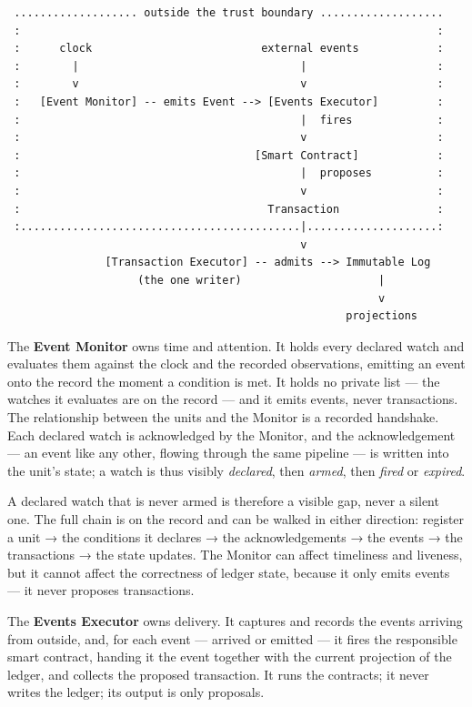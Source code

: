 \documentclass[11pt,a4paper]{article}
\begin{document}
\begin{verbatim}
 ................... outside the trust boundary ...................
 :                                                                :
 :      clock                          external events            :
 :        |                                  |                    :
 :        v                                  v                    :
 :   [Event Monitor] -- emits Event --> [Events Executor]         :
 :                                           |  fires             :
 :                                           v                    :
 :                                    [Smart Contract]            :
 :                                           |  proposes          :
 :                                           v                    :
 :                                      Transaction               :
 :...........................................|....................:
                                             v
               [Transaction Executor] -- admits --> Immutable Log
                    (the one writer)                     |
                                                         v
                                                    projections
\end{verbatim}

The \textbf{Event Monitor} owns time and attention. It holds every
declared watch and evaluates them against the clock and the recorded
observations, emitting an event onto the record the moment a condition
is met. It holds no private list --- the watches it evaluates are on the
record --- and it emits events, never transactions. The relationship
between the units and the Monitor is a recorded handshake. Each declared
watch is acknowledged by the Monitor, and the acknowledgement --- an
event like any other, flowing through the same pipeline --- is written
into the unit's state; a watch is thus visibly \emph{declared}, then
\emph{armed}, then \emph{fired} or \emph{expired}.

A declared watch that is never armed is therefore a visible gap, never a
silent one. The full chain is on the record and can be walked in either
direction: register a unit → the conditions it declares → the
acknowledgements → the events → the transactions → the state updates.
The Monitor can affect timeliness and liveness, but it cannot affect the
correctness of ledger state, because it only emits events --- it never
proposes transactions.

The \textbf{Events Executor} owns delivery. It captures and records the
events arriving from outside, and, for each event --- arrived or emitted
--- it fires the responsible smart contract, handing it the event
together with the current projection of the ledger, and collects the
proposed transaction. It runs the contracts; it never writes the ledger;
its output is only proposals.
\end{document}

